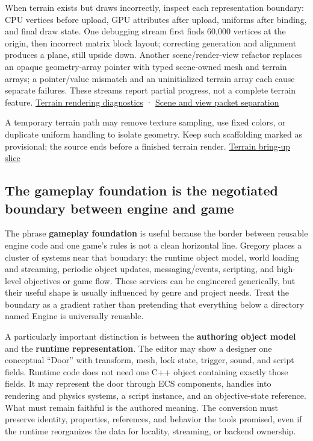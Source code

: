 When terrain exists but draws incorrectly, inspect each representation boundary: CPU vertices before upload, GPU attributes after upload, uniforms after binding, and final draw state. One debugging stream first finds 60,000 vertices at the origin, then incorrect matrix block layout; correcting generation and alignment produces a plane, still upside down. Another scene/render-view refactor replaces an opaque geometry-array pointer with typed scene-owned mesh and terrain arrays; a pointer/value mismatch and an uninitialized terrain array each cause separate failures. These streams report partial progress, not a complete terrain feature. \href{https://www.youtube.com/watch?v=N34cyDfZVtA}{Terrain rendering diagnostics} · \href{https://www.youtube.com/watch?v=JgMCoxs0nqo}{Scene and view packet separation}

A temporary terrain path may remove texture sampling, use fixed colors, or duplicate uniform handling to isolate geometry. Keep such scaffolding marked as provisional; the source ends before a finished terrain render. \href{https://www.youtube.com/watch?v=X9EYh-EfOz4}{Terrain bring-up slice}

\subsection{The gameplay foundation is the negotiated boundary between engine and game}\label{06-engine-ii-ch031-the-gameplay-foundation-is-the-negotiated-boundary-between-engine-and-game}

\hypertarget{06-engine-ii-ch031-the-gameplay-foundation-is-the-negotiated-boundary-between-engine-and-game}{}

The phrase \textbf{gameplay foundation} is useful because the border between reusable engine code and one game's rules is not a clean horizontal line. Gregory places a cluster of systems near that boundary: the runtime object model, world loading and streaming, periodic object updates, messaging/events, scripting, and high-level objectives or game flow. These services can be engineered generically, but their useful shape is usually influenced by genre and project needs. Treat the boundary as a gradient rather than pretending that everything below a directory named Engine is universally reusable.

A particularly important distinction is between the \textbf{authoring object model} and the \textbf{runtime representation}. The editor may show a designer one conceptual ``Door'' with transform, mesh, lock state, trigger, sound, and script fields. Runtime code does not need one C++ object containing exactly those fields. It may represent the door through ECS components, handles into rendering and physics systems, a script instance, and an objective-state reference. What must remain faithful is the authored meaning. The conversion must preserve identity, properties, references, and behavior the tools promised, even if the runtime reorganizes the data for locality, streaming, or backend ownership.

